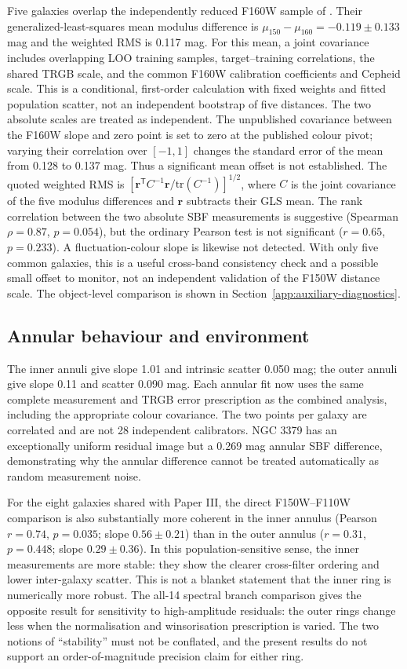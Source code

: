 \documentclass[nodoi,nocopyright]{pas}
\begin{document}
Five galaxies overlap the independently reduced F160W sample of
\citet{Jensen2015}. Their generalized-least-squares mean modulus difference is
$\mu_{150}-\mu_{160}=-0.119\pm0.133$ mag and the weighted RMS is 0.117 mag.
For this mean, a joint covariance includes overlapping LOO training samples,
target--training correlations, the shared TRGB scale, and the common F160W
calibration coefficients and Cepheid scale. This is a conditional,
first-order calculation with fixed weights and fitted population scatter,
not an independent bootstrap of five distances. The two absolute scales
are treated as independent. The unpublished covariance between the F160W
slope and zero point is set to zero at the published colour pivot;
varying their correlation over $[-1,1]$ changes the standard error of the
mean from 0.128 to 0.137 mag. Thus a significant mean offset is not established.
The quoted weighted RMS is
$[\boldsymbol{r}^{\mathsf T}C^{-1}\boldsymbol{r}/\mathrm{tr}(C^{-1})]^{1/2}$,
where $C$ is the joint covariance of the five modulus differences and
$\boldsymbol{r}$ subtracts their GLS mean.
The rank correlation between the two absolute SBF measurements is suggestive
(Spearman $\rho=0.87$, $p=0.054$), but the ordinary Pearson test is not
significant ($r=0.65$, $p=0.233$). A fluctuation-colour slope is likewise not
detected. With only five common galaxies, this is a useful cross-band
consistency check and a possible small offset to monitor, not an independent
validation of the F150W distance scale. The object-level comparison is shown
in Section~\ref{app:auxiliary-diagnostics}.

\subsection{Annular behaviour and environment}
\label{sec:annular-results}

The inner annuli give slope 1.01 and intrinsic scatter 0.050 mag; the outer
annuli give slope 0.11 and scatter 0.090 mag. Each annular fit now uses the
same complete measurement and TRGB error prescription as the combined
analysis, including the appropriate colour covariance. The two points per galaxy are
correlated and are not 28 independent calibrators. NGC 3379 has an
exceptionally uniform residual image but a 0.269 mag annular SBF difference,
demonstrating why the annular difference cannot be treated automatically as
random measurement noise.

For the eight galaxies shared with Paper III, the direct F150W--F110W
comparison is also substantially more coherent in the inner annulus
(Pearson $r=0.74$, $p=0.035$; slope $0.56\pm0.21$) than in the outer annulus
($r=0.31$, $p=0.448$; slope $0.29\pm0.36$). In this population-sensitive
sense, the inner measurements are more stable: they show the clearer
cross-filter ordering and lower inter-galaxy scatter. This is not a blanket
statement that the inner ring is numerically more robust. The all-14 spectral
branch comparison gives the opposite result for sensitivity to
high-amplitude residuals: the outer rings change less when the normalisation
and winsorisation prescription is varied. The two notions
of ``stability'' must not be conflated, and the present results do not support
an order-of-magnitude precision claim for either ring.
\end{document}
